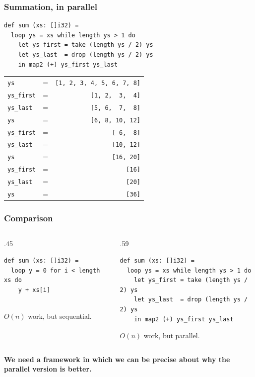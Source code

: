 \begin{frame}[fragile]
  \frametitle{Summation, in parallel}

\begin{lstlisting}
def sum (xs: []i32) =
  loop ys = xs while length ys > 1 do
    let ys_first = take (length ys / 2) ys
    let ys_last  = drop (length ys / 2) ys
    in map2 (+) ys_first ys_last
\end{lstlisting}

  \pause \small
  \begin{tabular}{lcr}
    \texttt{ys} & = &        \texttt{[1, 2, 3, 4, 5, 6, 7, 8]} \\
    \texttt{ys\_first} & = & \texttt{[1, 2, ~3, ~4]} \\
    \texttt{ys\_last} & = &  \texttt{[5, 6, ~7, ~8]} \\\hline
    \texttt{ys} & = &        \texttt{[6, 8, 10, 12]} \\
    \texttt{ys\_first} & = & \texttt{[~6, ~8]} \\
    \texttt{ys\_last} & = &  \texttt{[10, 12]} \\\hline
    \texttt{ys} & = &        \texttt{[16, 20]} \\
    \texttt{ys\_first} & = & \texttt{[16]} \\
    \texttt{ys\_last} & = &  \texttt{[20]} \\\hline
    \texttt{ys} & = & \texttt{[36]} \\
  \end{tabular}

\end{frame}

\begin{frame}[fragile]
  \frametitle{Comparison}

  \begin{columns}
    \begin{column}[t]{.45\textwidth}
\begin{lstlisting}
def sum (xs: []i32) =
  loop y = 0 for i < length xs do
    y + xs[i]


\end{lstlisting}

      $O(n)$ work, but sequential.

    \end{column}
    \begin{column}[t]{.59\textwidth}
\begin{lstlisting}
def sum (xs: []i32) =
  loop ys = xs while length ys > 1 do
    let ys_first = take (length ys / 2) ys
    let ys_last  = drop (length ys / 2) ys
    in map2 (+) ys_first ys_last
\end{lstlisting}

      $O(n)$ work, but parallel.

    \end{column}

  \end{columns}

  \bigskip
  \textbf{We need a framework in which we can be precise about why the parallel
    version is better.}

\end{frame}

